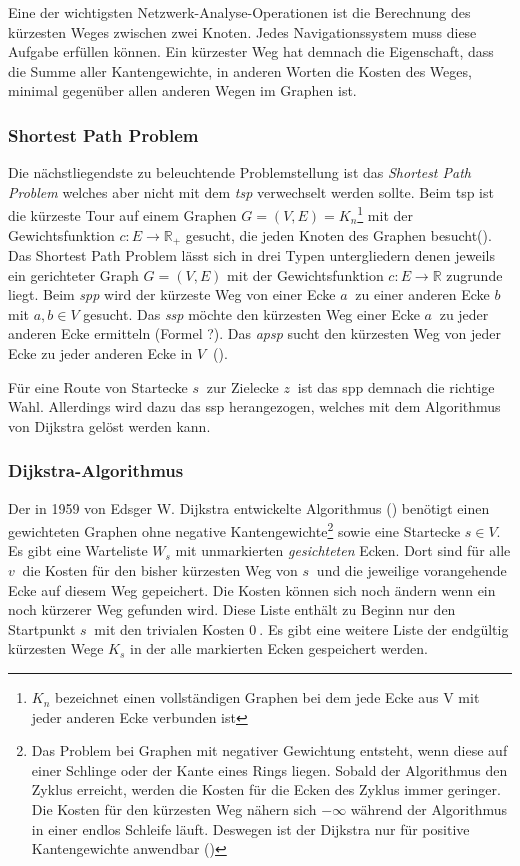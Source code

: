 \documentclass[12pt,a4paper]{article}
\begin{document}
Eine der wichtigsten Netzwerk-Analyse-Operationen ist die Berechnung des kürzesten Weges zwischen zwei Knoten. Jedes Navigationssystem muss diese Aufgabe erfüllen können. Ein kürzester Weg hat demnach die Eigenschaft, dass die Summe aller Kantengewichte, in anderen Worten die Kosten des Weges, minimal gegenüber allen anderen Wegen im Graphen ist.

\subsubsection{Shortest Path Problem}
Die nächstliegendste zu beleuchtende Problemstellung ist das \textit{Shortest Path Problem} welches aber nicht mit dem \textit{\gls{tsp}} verwechselt werden sollte. Beim \gls{tsp} ist die kürzeste Tour auf einem Graphen $G  = (V,E) = K_{n}$\footnote{$K_{n}$ bezeichnet einen vollständigen Graphen bei dem jede Ecke aus V mit jeder anderen Ecke verbunden ist} mit der Gewichtsfunktion $c: E \rightarrow \mathbb{R}_{+}$ gesucht, die jeden Knoten des Graphen besucht(\cite[135]{algorithms}).
Das Shortest Path Problem lässt sich in drei Typen untergliedern denen jeweils ein gerichteter Graph $G = (V,E)$ mit der Gewichtsfunktion $c: E \rightarrow \mathbb{R}$ zugrunde liegt. Beim \textit{\gls{spp}} wird der kürzeste Weg von einer Ecke $a~$ zu einer anderen Ecke $b~$ mit $a,b\in V$ gesucht. Das \textit{\gls{ssp}} möchte den kürzesten Weg einer Ecke $a~$ zu jeder anderen Ecke ermitteln (Formel ?). Das \textit{\gls{apsp}} sucht den kürzesten Weg von jeder Ecke zu jeder anderen Ecke in $V~$ (\cite[169\psq]{algorithms}).

Für eine Route von Startecke $s~$ zur Zielecke $z~$ ist das \gls{spp} demnach die richtige Wahl. Allerdings wird dazu das \gls{ssp} herangezogen, welches mit dem Algorithmus von Dijkstra gelöst werden kann.


\subsubsection{Dijkstra-Algorithmus}
\label{sec:dijkstra}
Der in 1959 von Edsger W. Dijkstra entwickelte Algorithmus (\cite{dijkstra}) benötigt einen gewichteten Graphen ohne negative Kantengewichte\footnote{Das Problem bei Graphen mit negativer Gewichtung entsteht, wenn diese auf einer Schlinge oder der Kante eines Rings liegen. Sobald der Algorithmus den Zyklus erreicht, werden die Kosten für die Ecken des Zyklus immer geringer. Die Kosten für den kürzesten Weg nähern sich $-\infty $ während der Algorithmus in einer endlos Schleife läuft. Deswegen ist der Dijkstra nur für positive Kantengewichte anwendbar (\cite[194\psq]{kurt})} sowie eine Startecke $s \in V$. Es gibt eine Warteliste $W_{s}$ mit unmarkierten \textit{gesichteten} Ecken. Dort sind für alle $v~$ die Kosten für den bisher kürzesten Weg von $s~$ und die jeweilige vorangehende Ecke auf diesem Weg gepeichert. Die Kosten können sich noch ändern wenn ein noch kürzerer Weg gefunden wird. Diese Liste enthält zu Beginn nur den Startpunkt $s~$ mit den trivialen Kosten $0~$. Es gibt eine weitere Liste der endgültig kürzesten Wege $K_{s}$ in der alle markierten Ecken gespeichert werden.
\end{document}
